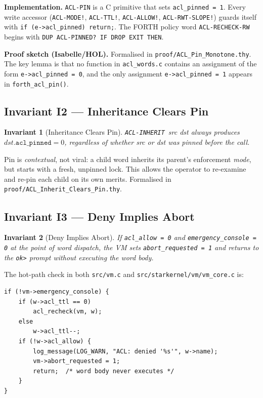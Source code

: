 \documentclass[11pt,letterpaper,openany]{article}
\newtheorem{invariant}{Invariant}
\newcommand{\acl}[1]{\texttt{#1}}
\begin{document}
\noindent
\textbf{Implementation.}
\acl{ACL-PIN} is a C primitive that sets \texttt{acl\_pinned = 1}.
Every write accessor (\acl{ACL-MODE!}, \acl{ACL-TTL!}, \acl{ACL-ALLOW!},
\acl{ACL-RWT-SLOPE!}) guards itself with \texttt{if (e->acl\_pinned) return;}.
The FORTH policy word \acl{ACL-RECHECK-RW} begins with
\texttt{DUP ACL-PINNED? IF DROP EXIT THEN}.

\noindent
\textbf{Proof sketch (Isabelle/HOL).}  Formalised in
\texttt{proof/ACL\_Pin\_Monotone.thy}.  The key lemma is that no
function in \texttt{acl\_words.c} contains an assignment of the form
\texttt{e->acl\_pinned = 0}, and the only assignment
\texttt{e->acl\_pinned = 1} appears in \texttt{forth\_acl\_pin()}.

\subsection{Invariant I2 — Inheritance Clears Pin}

\begin{invariant}[Inheritance Clears Pin]
\label{inv:inherit}
\acl{ACL-INHERIT}~\textit{src dst} always produces
$\textit{dst}.\texttt{acl\_pinned} = 0$, regardless of whether
\textit{src} or \textit{dst} was pinned before the call.
\end{invariant}

\noindent
Pin is \emph{contextual}, not viral: a child word inherits its parent's
enforcement \emph{mode}, but starts with a fresh, unpinned lock.  This
allows the operator to re-examine and re-pin each child on its own
merits.  Formalised in \texttt{proof/ACL\_Inherit\_Clears\_Pin.thy}.

\subsection{Invariant I3 — Deny Implies Abort}

\begin{invariant}[Deny Implies Abort]
\label{inv:deny}
If \texttt{acl\_allow = 0} and \texttt{emergency\_console = 0} at the
point of word dispatch, the VM sets \texttt{abort\_requested = 1} and
returns to the \texttt{ok>} prompt without executing the word body.
\end{invariant}

\noindent
The hot-path check in both \texttt{src/vm.c} and
\texttt{src/starkernel/vm/vm\_core.c} is:

\begin{lstlisting}[style=cstyle]
if (!vm->emergency_console) {
    if (w->acl_ttl == 0)
        acl_recheck(vm, w);
    else
        w->acl_ttl--;
    if (!w->acl_allow) {
        log_message(LOG_WARN, "ACL: denied '%s'", w->name);
        vm->abort_requested = 1;
        return;  /* word body never executes */
    }
}
\end{lstlisting}
\end{document}
